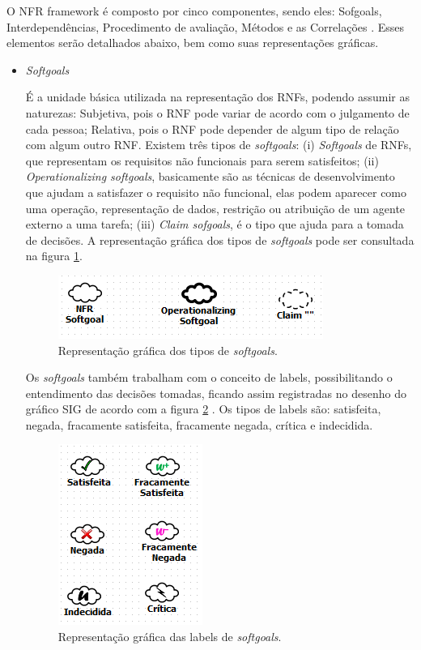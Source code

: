 O NFR framework é composto por cinco componentes, sendo eles: Sofgoals, Interdependências, Procedimento de avaliação, Métodos e as Correlações \cite{chung2012non}. Esses elementos serão detalhados abaixo, bem como suas representações gráficas. 

\begin{itemize}
	\item \textit{Softgoals}
	
	É a unidade básica utilizada na representação dos RNFs, podendo assumir as naturezas: Subjetiva, pois o RNF pode variar de acordo com o julgamento de cada pessoa; Relativa, pois o RNF pode depender de algum tipo de relação com algum outro RNF. Existem três tipos de \textit{softgoals}: (i) \textit{Softgoals} de RNFs, que representam os requisitos não funcionais para serem satisfeitos; (ii) \textit{Operationalizing softgoals}, basicamente são as técnicas de desenvolvimento que ajudam a satisfazer o requisito não funcional, elas podem aparecer como uma operação, representação de dados, restrição ou atribuição de um agente externo a uma tarefa; (iii) \textit{Claim sofgoals}, é o tipo que ajuda para a tomada de decisões. A representação gráfica dos tipos de \textit{softgoals} pode ser consultada na figura \ref{fig01}.
	
	\begin{figure}[h]
		\centering
		\includegraphics[keepaspectratio=true,scale=0.9]{figuras/tiposDeSoftgoals.png}
		\caption{Representação gráfica dos tipos de \textit{softgoals}.}
		\label{fig01}
	\end{figure} 

	Os \textit{softgoals} também trabalham com o conceito de labels, possibilitando o entendimento das decisões tomadas, ficando assim registradas no desenho do gráfico SIG de acordo com  a figura \ref{fig02} . Os tipos de labels são: satisfeita, negada, fracamente satisfeita, fracamente negada, crítica e indecidida.
	

	\begin{figure}[h]
		\centering
		\includegraphics[keepaspectratio=true,scale=0.9]{figuras/labelsSoftgoals.png}
		\caption{Representação gráfica das labels de \textit{softgoals}.}
		\label{fig02}
	\end{figure} 


\end{itemize}
